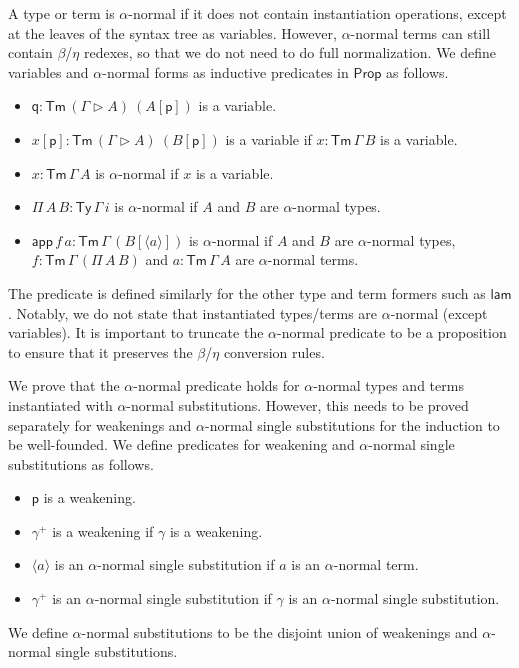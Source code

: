 \documentclass[a4paper,UKenglish,cleveref, autoref, thm-restate]{lipics-v2021}
\newcommand{\Prop}{\mathsf{Prop}}
\newcommand{\Ty}{\mathsf{Ty}}
\newcommand{\Tm}{\mathsf{Tm}}
\newcommand{\p}{\mathsf{p}}
\newcommand{\q}{\mathsf{q}}
\newcommand{\ext}{\mathop{\triangleright}}
\newcommand{\lam}{\mathsf{lam}}
\newcommand{\app}{\mathsf{app}}
\begin{document}
A type or term is $\alpha$-normal if it does not contain instantiation
operations, except at the leaves of the syntax tree as variables. However,
$\alpha$-normal terms can still contain $\beta$/$\eta$ redexes, so that we do
not need to do full normalization. We define variables and $\alpha$-normal forms
as inductive predicates in $\Prop$ as follows.
\begin{itemize}
  \item $\q:\Tm\,(\Gamma\ext A)\ (A[\p])$ is a variable.
  \item $x[\p]:\Tm\,(\Gamma\ext A)\ (B[\p])$ is a variable if $x:\Tm\,\Gamma\,B$
  is a variable.
  \item $x:\Tm\,\Gamma\,A$ is $\alpha$-normal if $x$ is a variable.
  \item $\Pi\,A\,B:\Ty\,\Gamma\,i$ is $\alpha$-normal if $A$ and $B$ are
  $\alpha$-normal types.
  \item $\app\,f\,a:\Tm\,\Gamma\,(B[\langle a \rangle])$ is $\alpha$-normal if
  $A$ and $B$ are $\alpha$-normal types, $f:\Tm\,\Gamma\,(\Pi\,A\,B)$ and
  $a:\Tm\,\Gamma\,A$ are $\alpha$-normal terms.
\end{itemize}
The predicate is defined similarly for the other type and term formers such as
$\lam$. Notably, we do not state that instantiated types/terms are
$\alpha$-normal (except variables). It is important to truncate the
$\alpha$-normal predicate to be a proposition to ensure that it preserves the
$\beta$/$\eta$ conversion rules.

We prove that the $\alpha$-normal predicate holds for $\alpha$-normal types and
terms instantiated with $\alpha$-normal substitutions. However, this needs to be
proved separately for weakenings and $\alpha$-normal single substitutions for
the induction to be well-founded. We define predicates for weakening and
$\alpha$-normal single substitutions as follows.
\begin{itemize}
  \item $\p$ is a weakening.
  \item $\gamma^+$ is a weakening if $\gamma$ is a weakening.
  \item $\langle a \rangle$ is an $\alpha$-normal single substitution if $a$ is an
  $\alpha$-normal term.
  \item $\gamma^+$ is an $\alpha$-normal single substitution if $\gamma$ is an
  $\alpha$-normal single substitution.
\end{itemize}
We define $\alpha$-normal substitutions to be the disjoint union of weakenings
and $\alpha$-normal single substitutions.
\end{document}
